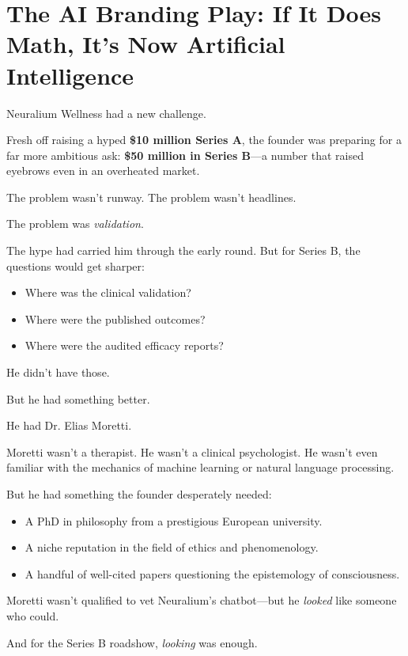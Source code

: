 \section{The AI\texttrademark{} Branding Play: If It Does Math, It’s Now Artificial Intelligence}

Neuralium Wellness had a new challenge.

Fresh off raising a hyped \textbf{\$10 million Series A}, the founder was preparing for a far more ambitious ask:  
\textbf{\$50 million in Series B}—a number that raised eyebrows even in an overheated market.

The problem wasn’t runway. The problem wasn’t headlines.

The problem was \textit{validation}.

The hype had carried him through the early round. But for Series B, the questions would get sharper:  

\begin{itemize}
  \item Where was the clinical validation?  
  \item Where were the published outcomes?  
  \item Where were the audited efficacy reports?
\end{itemize}

He didn’t have those.

But he had something better.

He had Dr. Elias Moretti.

Moretti wasn’t a therapist. He wasn’t a clinical psychologist. He wasn’t even familiar with the mechanics of 
machine learning or natural language processing.

But he had something the founder desperately needed:

\begin{itemize}
  \item A PhD in philosophy from a prestigious European university.
  \item A niche reputation in the field of ethics and phenomenology.
  \item A handful of well-cited papers questioning the epistemology of consciousness.
\end{itemize}

Moretti wasn’t qualified to vet Neuralium’s chatbot—but he \textit{looked} like someone who could.

And for the Series B roadshow, \textit{looking} was enough.

\medskip

